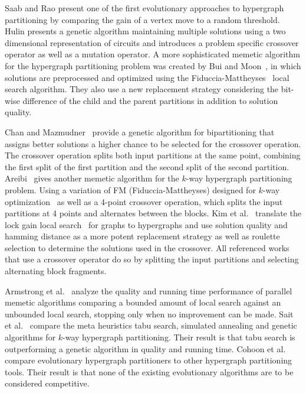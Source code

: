 \documentclass[a4paper,12pt,titlepage, BCOR7mm,headsepline]{scrbook}
\numberwithin{equation}{section}
\begin{document}



Saab and Rao \cite{saab1989evolution} present one of the first evolutionary approaches to hypergraph partitioning %
by comparing the gain of a vertex move to a random threshold. %
Hulin \cite{hulin1990circuit} presents a genetic algorithm maintaining multiple solutions using a two dimensional representation of circuits and introduces a problem specific crossover operator as well as a mutation operator. A more sophisticated memetic algorithm for the hypergraph partitioning problem was created by Bui and Moon~\cite{bui1994fast}, in which solutions are preprocessed and optimized using the Fiduccia-Mattheyses~\cite{fiduccia1988linear} local search algorithm. They also use a new replacement strategy considering the bit-wise difference of the child and the parent partitions in addition to solution quality. 

Chan and Mazmudner~\cite{chan1995systolic} provide a genetic algorithm for bipartitioning that assigns better solutions a higher chance to be selected for the crossover operation. The crossover operation splits both input partitions at the same point, combining the first split of the first partition and the second split of the second partition.
Areibi~\cite{areibi2000integrated} gives another memetic algorithm for the $k$-way hypergraph partitioning problem. Using a variation of FM (Fiduccia-Mattheyses) designed for $k$-way optimization~\cite{sanchis1989multiple} as well as a 4-point crossover operation, which splits the input partitions at 4 points and alternates between the blocks.
Kim et al.~\cite{kim2004hybrid} translate the lock gain local search~\cite{kim2004lock} for graphs to hypergraphs and use solution quality and hamming distance as a more potent replacement strategy as well as roulette selection to determine the solutions used in the crossover. All referenced works that use a crossover operator do so by splitting the input partitions and selecting alternating block fragments. 

Armstrong et al.~\cite{armstrong2010investigation} analyze the quality and running time performance of parallel memetic algorithms comparing a bounded amount of local search against an unbounded local search, stopping only when no improvement can be made. Sait et al.~\cite{sait2006evolutionary} compare the meta heuristics tabu search, simulated annealing and genetic algorithms for $k$-way hypergraph partitioning. Their result is that tabu search is outperforming a genetic algorithm in quality and running time.
Cohoon et al.~\cite{cohoon2003evolutionary} compare evolutionary hypergraph partitioners to other hypergraph partitioning tools. Their result is that none of the existing evolutionary algorithms are to be considered competitive.
\end{document}
